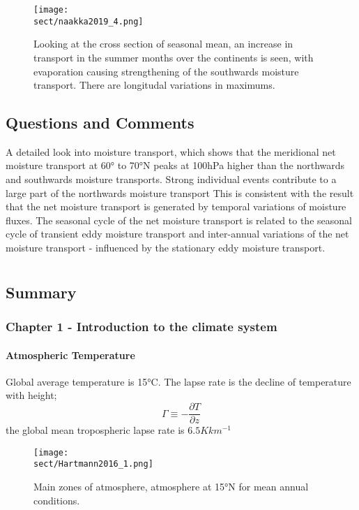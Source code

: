 \documentclass{article}
\begin{document}
\begin{figure}[ht]
    \centering
    \vspace{-4mm}
    \texttt{[image: \\sect/naakka2019\_4.png]}
    \vspace{-4mm}
    \caption{Looking at the cross section of seasonal mean, an increase in transport in the summer months over the continents is seen, with evaporation causing strengthening of the southwards moisture transport. There are longitudal variations in maximums. }\label{f:naakka2019_3.png}
\end{figure}
\subsection*{Questions and Comments}
A detailed look into moisture transport, which shows that the meridional net moisture transport at 60° to 70°N peaks at 100hPa higher than the northwards and southwards moisture transports.
Strong individual events contribute to a large part of the northwards moisture transport 
This is consistent with the result that the net moisture transport is generated by temporal variations of moisture fluxes. 
The seasonal cycle of the net moisture transport is related to the seasonal cycle of transient eddy moisture transport  and inter-annual variations of the net moisture transport - influenced by the stationary eddy moisture transport.
\newpage
\clearpage
\newpage
\clearpage




\def \sect {Hartmann2016}
\section{\citeauthor{\sect} \citeyear{\sect}}
\textbf{\citefield{\sect}{title}\nocite{\sect}}
\subsection*{Summary}
\subsubsection*{Chapter 1 - Introduction to the climate system}
\paragraph*{Atmospheric Temperature}
Global average temperature is 15°C. The lapse rate is the decline of temperature with height;
\begin{equation}
    \Gamma \equiv - \frac{\partial T}{\partial z} 
\end{equation}
the global mean tropospheric lapse rate is $6.5 K km^{-1}$
\begin{figure}[ht]
    \centering
    \vspace{-4mm}
    \texttt{[image: \\sect/Hartmann2016\_1.png]}
    \vspace{-4mm}
    \caption{Main zones of atmosphere, atmosphere at 15°N for mean annual conditions.}\label{f:Hartmann2016_1}
\end{figure}
\end{document}

